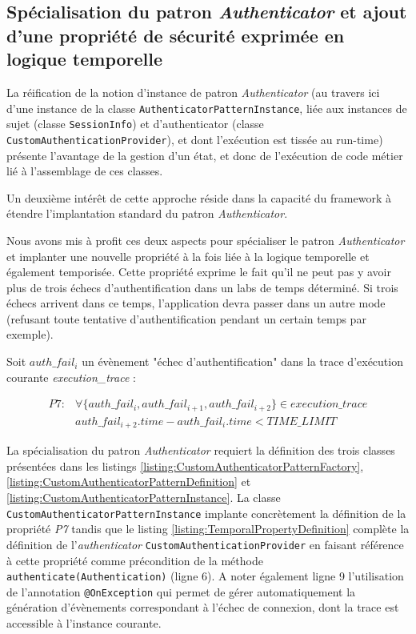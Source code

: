 \subsection{Spécialisation du patron \textit{Authenticator} et ajout d'une propriété de sécurité exprimée en logique temporelle}

La réification de la notion d'instance de patron \textit{Authenticator} (au travers ici d'une instance de la classe \texttt{AuthenticatorPatternInstance}, liée aux instances de sujet (classe \texttt{SessionInfo}) et d'authenticator (classe \texttt{CustomAuthenticationProvider}), et dont l'exécution est tissée au run-time) présente l'avantage de la gestion d'un état, et donc de l'exécution de code métier lié à l'assemblage de ces classes.

Un deuxième intérêt de cette approche réside dans la capacité du framework à étendre l'implantation standard du patron \textit{Authenticator}.

Nous avons mis à profit ces deux aspects pour spécialiser le patron \textit{Authenticator} et implanter une nouvelle propriété à la fois liée à la logique temporelle et également temporisée. Cette propriété exprime le fait qu'il ne peut pas y avoir plus de trois échecs d'authentification dans un labs de temps déterminé. Si trois échecs arrivent dans ce temps, l'application devra passer dans un autre mode (refusant toute tentative d'authentification pendant un certain temps par exemple).

Soit $auth\_fail_i$ un évènement "échec d'authentification" dans la trace d'exécution courante \textit{execution\_trace} :

    \begin{equation*}
       \begin{split}
           P7:& \forall \{ auth\_fail_i,auth\_fail_{i+1},auth\_fail_{i+2} \} \in execution\_trace \\
          &auth\_fail_{i+2}.time - auth\_fail_i.time < TIME\_LIMIT
      \end{split}
    \end{equation*}

La spécialisation du patron \textit{Authenticator} requiert la définition des trois classes présentées dans les listings \ref{listing:CustomAuthenticatorPatternFactory}, \ref{listing:CustomAuthenticatorPatternDefinition} et \ref{listing:CustomAuthenticatorPatternInstance}. La classe \texttt{CustomAuthenticatorPatternInstance} implante concrètement la définition de la propriété \textit{P7} tandis que le listing \ref{listing:TemporalPropertyDefinition} complète la définition de l'\textit{authenticator} \texttt{CustomAuthenticationProvider} en faisant référence à cette propriété comme précondition de la méthode \texttt{authenticate(Authentication)} (ligne 6). A noter également ligne 9 l'utilisation de l'annotation \texttt{@OnException} qui permet de gérer automatiquement la génération d'évènements correspondant à l'échec de connexion, dont la trace est accessible à l'instance courante.



